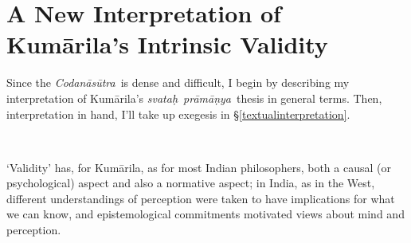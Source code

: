\documentclass[11pt,letterpaper,oneside]{amsart}
\newcommand{\e}{\emph}
\newcommand{\kum}{Kum\={a}rila}
\newcommand{\cod}{\e{Codan\={a}s\={u}tra}}
\newcommand{\sva}{\e{svata\d{h}}}
\newcommand{\pra}{\e{pr\={a}m\={a}\d{n}ya}}
\begin{document}










\section{A New Interpretation of Kum\=arila's Intrinsic Validity}
\label{validity} \label{interpoutline}


Since the \cod\ is dense and difficult, I begin by describing my interpretation of \kum's \sva\ \pra\ thesis in general terms. Then, interpretation in hand, I'll take up exegesis in \S\ref{textualinterpretation}.

\

`Validity' has, for Kum\=arila, as for most Indian philosophers, both a causal (or psychological) aspect and also a normative aspect; in India, as in the West, different understandings of perception were taken to have implications for what we can know, and epistemological commitments motivated views about mind and perception.
\end{document}
